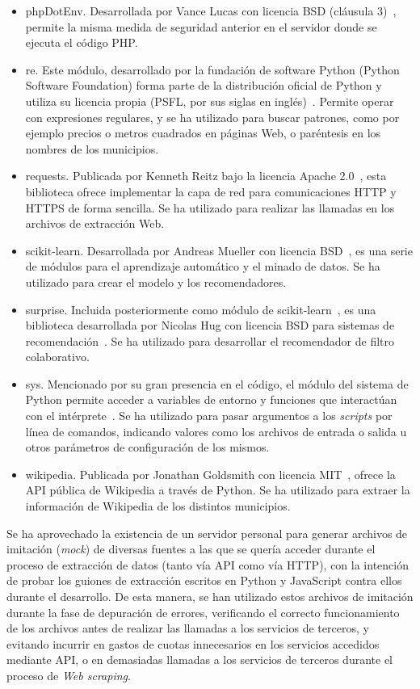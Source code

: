 \begin{itemize}
    \item phpDotEnv. Desarrollada por Vance Lucas con licencia BSD (cláusula 3)~\cite{phpdotenv}, permite la misma medida de seguridad anterior en el servidor donde se ejecuta el código PHP.
    \item re. Este módulo, desarrollado por la fundación de software Python (\guillemotleft Python Software Foundation\guillemotright\space) forma parte de la distribución oficial de Python y utiliza su licencia propia (PSFL, por sus siglas en inglés)~\cite{re}. Permite operar con expresiones regulares, y se ha utilizado para buscar patrones, como por ejemplo precios o metros cuadrados en páginas Web, o paréntesis en los nombres de los municipios.
    \item requests. Publicada por Kenneth Reitz bajo la licencia Apache 2.0~\cite{requests}, esta biblioteca ofrece implementar la capa de red para comunicaciones HTTP y HTTPS de forma sencilla. Se ha utilizado para realizar las llamadas en los archivos de extracción Web.
    \item scikit-learn. Desarrollada por Andreas Mueller con licencia BSD~\cite{scikit}, es una serie de módulos para el aprendizaje automático y el minado de datos. Se ha utilizado para crear el modelo y los recomendadores.
    \item surprise. Incluida posteriormente como módulo de scikit-learn~\cite{scikit_surprise}, es una biblioteca desarrollada por Nicolas Hug con licencia BSD para sistemas de recomendación~\cite{surprise}. Se ha utilizado para desarrollar el recomendador de filtro colaborativo.
    \item sys. Mencionado por su gran presencia en el código, el módulo del sistema de Python permite acceder a variables de entorno y funciones que interactúan con el intérprete~\cite{sys}. Se ha utilizado para pasar argumentos a los \textit{scripts} por línea de comandos, indicando valores como los archivos de entrada o salida u otros parámetros de configuración de los mismos.
    \item wikipedia. Publicada por Jonathan Goldsmith con licencia MIT~\cite{wikipedia_py}, ofrece la API pública de Wikipedia a través de Python. Se ha utilizado para extraer la información de Wikipedia de los distintos municipios.
\end{itemize}

Se ha aprovechado la existencia de un servidor personal para generar archivos de imitación (\textit{mock}) de diversas fuentes a las que se quería acceder durante el proceso de extracción de datos (tanto vía API como vía HTTP), con la intención de probar los guiones de extracción escritos en Python y JavaScript contra ellos durante el desarrollo. De esta manera, se han utilizado estos archivos de imitación durante la fase de depuración de errores, verificando el correcto funcionamiento de los archivos antes de realizar las llamadas a los servicios de terceros, y evitando incurrir en gastos de cuotas innecesarios en los servicios accedidos mediante API, o en demasiadas llamadas a los servicios de terceros durante el proceso de \textit{Web scraping}.

